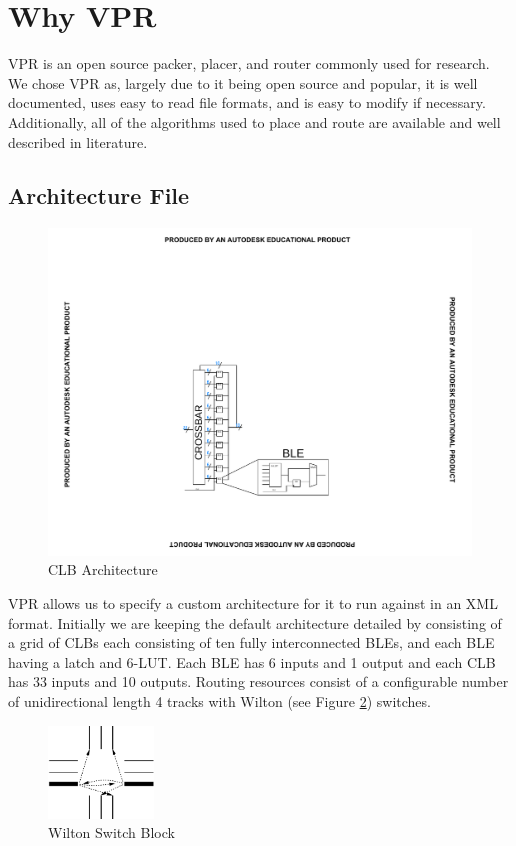 \documentclass[12pt,drafta4paper,oneside]{memoir} %
\begin{document}
\section{Why VPR}\label{VPRSection}
\ac{VPR} is an open source packer, placer, and router commonly used for research. We chose \ac{VPR} as, largely due to it being open source and popular, it is well documented, uses easy to read file formats, and is easy to modify if necessary. Additionally, all of the algorithms used to place and route are available and well described in literature.

\subsection{Architecture File}\label{ArchFile}
\begin{figure}
    \includegraphics[clip,trim=5cm 4cm 5cm 8cm]{images/CLB.pdf}
    \caption{CLB Architecture}
    \label{Arch}
\end{figure}
\ac{VPR} allows us to specify a custom architecture for it to run against in an XML format. Initially we are keeping the default architecture detailed by \cite{VPRManual} consisting of a grid of \acp{CLB} each consisting of ten fully interconnected \acp{BLE}, and each \ac{BLE} having a latch and 6-\ac{LUT}.
Each \ac{BLE} has 6 inputs and 1 output and each \ac{CLB} has 33 inputs and 10 outputs.
Routing resources consist of a configurable number of unidirectional length 4 tracks with \ac{Wilton} (see Figure \ref{WiltonSwitch}) switches.
\begin{figure}
\includegraphics[width=0.25\textwidth]{images/wiltonswitch.png}
\caption{Wilton Switch Block\cite{WiltonSwitch}}
\label{WiltonSwitch}
\end{figure}
\end{document}
